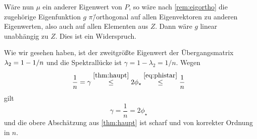 \documentclass[ngerman,a4paper,11pt]{scrartcl}
\newcommand{\RR}{\mathbb{R}}
\DeclarePairedDelimiter{\sprod}{\langle}{\rangle}	%
\DeclarePairedDelimiter{\abs}{\lvert}{\rvert}		%
\begin{document}
\begin{exmp}
\begin{dproof}
  Wäre nun $\mu$ ein anderer Eigenwert von $P$, so
  wäre nach \cref{rem:eigortho} die zugehörige Eigenfunktion $g$
  $\pi$\=/orthogonal auf allen Eigenvektoren zu anderen Eigenwerten, also auch auf
  allen Elementen aus $Z$. Dann wäre $g$ linear unabhängig zu $Z$. Dies ist ein Widerspruch.

 \end{dproof}
 Wie wir gesehen haben, ist der zweitgrößte Eigenwert der Übergangsmatrix
 $\lambda_2=\nobreak 1-\nobreak 1/n$ und die Spektrallücke ist $\gamma=1-\lambda_2=1/n$. Wegen
 \begin{equation*}
  \frac{1}{n}=\gamma\overset{\ref{thm:haupt}}{\leq} 2\phi_\star\overset{\eqref{eq:phistar}}{\leq}\frac{1}{n} 
 \end{equation*}
 gilt 
 \begin{equation*}
  \gamma=\frac{1}{n}=2\phi_\star 
 \end{equation*}
 und die obere Abschätzung aus \cref{thm:haupt} ist scharf und von korrekter
 Ordnung in $n$.
\end{exmp}
\end{document}
